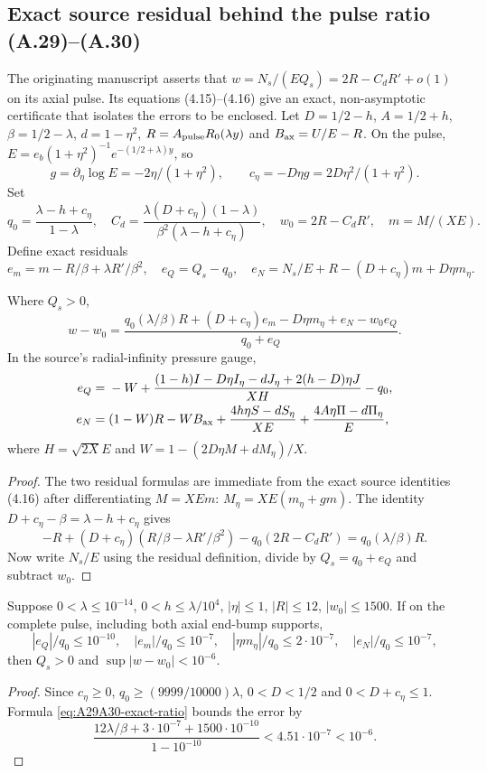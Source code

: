 \subsection*{Exact source residual behind the pulse ratio (A.29)--(A.30)}
\label{subsec:pulse-source-actual-ratio}
The originating manuscript \cite{openai2026} asserts that
$w=N_s/(E Q_s)=2R-C_dR'+o(1)$ on its axial pulse.
Its equations (4.15)--(4.16) give an exact, non-asymptotic
certificate that isolates the errors to be enclosed.
Let $D=1/2-h$, $A=1/2+h$, $\beta=1/2-\lambda$,
$d=1-\eta^2$, $R=A_{\rm pulse}R_0(\lambda y)$ and
$B_{\rm ax}=U/E-R$. On the pulse,
$E=e_b(1+\eta^2)^{-1}e^{-(1/2+\lambda)y}$, so
\[
g=\partial_\eta\log E=-2\eta/(1+\eta^2),\qquad
c_\eta=-D\eta g=2D\eta^2/(1+\eta^2).
\]
Set
\[
q_0=\frac{\lambda-h+c_\eta}{1-\lambda},\quad
C_d=\frac{\lambda(D+c_\eta)(1-\lambda)}
 {\beta^2(\lambda-h+c_\eta)},\quad
w_0=2R-C_dR',\quad m=M/(XE).
\]
Define exact residuals
\[
e_m=m-R/\beta+\lambda R'/\beta^2,\quad
e_Q=Q_s-q_0,\quad
e_N=N_s/E+R-(D+c_\eta)m+D\eta m_\eta.
\]
\begin{proposition}
\label{prop:A29A30-exact-residual}
Where $Q_s>0$,
\begin{equation}\label{eq:A29A30-exact-ratio}
\boxed{\displaystyle
w-w_0=\frac{q_0(\lambda/\beta)R+(D+c_\eta)e_m
      -D\eta m_\eta+e_N-w_0e_Q}{q_0+e_Q}.}
\end{equation}
In the source's radial-infinity pressure gauge,
\begin{align}
e_Q={}&-W+
 \frac{(1-h)I-D\eta I_\eta-dJ_\eta
       +2(h-D)\eta J}{XH}-q_0,\label{eq:A29A30-eq}\\
e_N={}&(1-W)R-WB_{\rm ax}
+\frac{4h\eta S-dS_\eta}{XE}
+\frac{4A\eta\Pi-d\Pi_\eta}{E},
\label{eq:A29A30-en}
\end{align}
where $H=\sqrt{2X}E$ and
$W=1-(2D\eta M+dM_\eta)/X$.
\end{proposition}
\begin{proof}
The two residual formulas are immediate from the exact
source identities (4.16) after differentiating $M=XEm$:
$M_\eta=XE(m_\eta+gm)$. The identity
$D+c_\eta-\beta=\lambda-h+c_\eta$ gives
\[
-R+(D+c_\eta)(R/\beta-\lambda R'/\beta^2)
-q_0(2R-C_dR')=q_0(\lambda/\beta)R.
\]
Now write $N_s/E$ using the residual definition, divide
by $Q_s=q_0+e_Q$ and subtract $w_0$.
\end{proof}

\begin{corollary}
\label{cor:A29A30-budget}
Suppose $0<\lambda\le10^{-14}$,
$0<h\le\lambda/10^4$, $|\eta|\le1$,
$|R|\le12$, $|w_0|\le1500$. If on the complete
pulse, including both axial end-bump supports,
\[
|e_Q|/q_0\le10^{-10},\quad
|e_m|/q_0\le10^{-7},\quad
|\eta m_\eta|/q_0\le2\cdot10^{-7},\quad
|e_N|/q_0\le10^{-7},
\]
then $Q_s>0$ and $\sup|w-w_0|<10^{-6}$.
\end{corollary}
\begin{proof}
Since $c_\eta\ge0$,
$q_0\ge(9999/10000)\lambda$,
$0<D<1/2$ and $0<D+c_\eta\le1$.
Formula \eqref{eq:A29A30-exact-ratio} bounds the error
by
\[
\frac{12\lambda/\beta+3\cdot10^{-7}
       +1500\cdot10^{-10}}{1-10^{-10}}
<4.51\cdot10^{-7}<10^{-6}.
\]
\end{proof}

